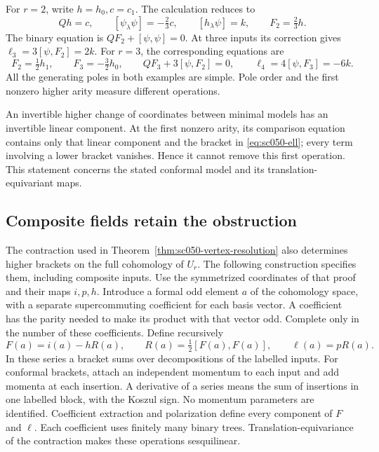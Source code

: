 For \(r=2\), write \(h=h_0,c=c_1\). The calculation reduces to
\[
 Qh=c,\qquad [\psi_\lambda\psi]=-\tfrac23c,\qquad
 [h_\lambda\psi]=k,\qquad F_2=\tfrac23h.
\]
The binary equation is \(QF_2+[\psi,\psi]=0\).
At three inputs its correction gives
\(\ell_3=3[\psi,F_2]=2k\).
For \(r=3\), the corresponding equations are
\[
 F_2=\tfrac12h_1,\qquad F_3=-\tfrac32h_0,\qquad
 QF_3+3[\psi,F_2]=0,\qquad \ell_4=4[\psi,F_3]=-6k.
\]
All the generating poles in both examples are simple. Pole order
and the first nonzero higher arity measure different operations.

An invertible higher change of coordinates between minimal models
has an invertible linear component. At the first nonzero arity,
its comparison equation contains only that linear component and
the bracket in \eqref{eq:sc050-ell}; every term involving a lower
bracket vanishes. Hence it cannot remove this first operation.
This statement concerns the stated conformal model and its
translation-equivariant maps.

\subsection{Composite fields retain the obstruction}

The contraction used in Theorem~\ref{thm:sc050-vertex-resolution}
also determines higher brackets on the full cohomology of \(U_r\).
The following construction specifies them, including composite
inputs. Use the symmetrized coordinates of that proof and their
maps \(i,p,h\). Introduce a formal odd element \(a\) of the
cohomology space, with a separate supercommuting coefficient for
each basis vector. A coefficient has the parity needed to make its
product with that vector odd. Complete only in the number of these
coefficients. Define recursively
\begin{equation}\label{eq:sc050-full-transfer}
 F(a)=i(a)-hR(a),\qquad
 R(a)=\tfrac12[F(a),F(a)],\qquad
 \ell(a)=pR(a).
\end{equation}
In these series a bracket sums over decompositions of the labelled
inputs. For conformal brackets, attach an independent momentum to
each input and add momenta at each insertion. A derivative of a
series means the sum of insertions in one labelled block, with
the Koszul sign. No momentum parameters are identified. Coefficient
extraction and polarization define every component of \(F\) and
\(\ell\). Each coefficient uses finitely many binary trees.
Translation-equivariance of the contraction makes these operations
sesquilinear.

